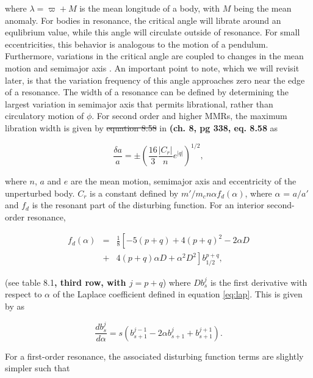 \documentclass[fleqn,usenatbib]{mnras}
\begin{document}
\noindent where $\lambda = \varpi + M$ is the mean longitude of a
body, with $M$ being the mean anomaly. For bodies in resonance, the critical angle will librate around an 
equlibrium value, while this angle will circulate outside of resonance. For small eccentricities, this behavior is analogous to the motion of a 
pendulum. Furthermore, variations in the critical angle are coupled to changes in the mean motion and semimajor axis \citep{1999ssd..book.....M}. An important 
point to note, which we will revisit later, is that the variation frequency of this angle approaches zero near the edge of a resonance. The 
width of a resonance can be defined by determining the largest variation in semimajor axis that permits librational, rather than circulatory motion of $\phi$. For 
second order and higher MMRs, the maximum libration width is given by \sout{equation 8.58} in \citet{1999ssd..book.....M} \textbf{(ch. 8, pg 338, eq. 8.58} as

\begin{equation}\label{eq:res_so}
	\frac{\delta a}{a} = \pm \left( \frac{16}{3} \frac{\left| C_{r} \right|}{n} e^{\left| q \right|} \right)^{1/2},
\end{equation}

\noindent where $n$, $a$ and $e$ are the mean motion, semimajor axis and eccentricity of the unperturbed body. $C_{r}$ is a constant defined by 
$m'/m_{c} n \alpha f_{d}(\alpha)$, where $\alpha$ = $a/a'$ and $f_{d}$ is the resonant part of the disturbing function. For an interior second-order 
resonance,

\begin{eqnarray}\label{eq:fd_so}
	f_{d} (\alpha) &=& \frac{1}{8} \left[ -5(p+q) + 4(p+q)^{2} - 2 \alpha D \right. \\ \nonumber
	                      & + & \left. 4(p+q) \alpha D + \alpha^{2} D^{2} \right] b^{p+q}_{1/2},
\end{eqnarray}

\noindent (see \citet{1999ssd..book.....M} table 8.1\textbf{, third row, with $j = p + q$}) where $D b^{j}_{s}$ is the first derivative with respect to $\alpha$ of the Laplace coefficient defined in equation \ref{eq:lap}. This is given by \citet{1961mcm..book.....B} as

\begin{equation}\label{eq:lap_d}
	\frac{d b_{s}^{j}}{d \alpha} = s \left( b_{s+1}^{j-1} - 2 \alpha b_{s+1}^{j} + b_{s+1}^{j+1} \right).
\end{equation}

For a first-order resonance, the associated disturbing function terms are slightly simpler such that
\end{document}
